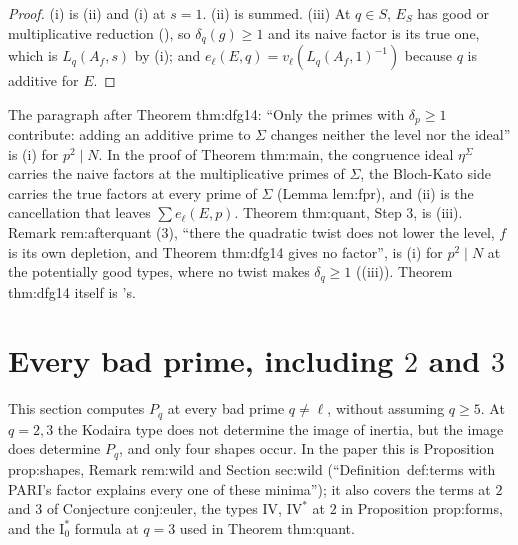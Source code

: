 \begin{proof}
(i) is (ii) and (i) at $s=1$. (ii) is  summed. (iii) At $q\in S$, $E_S$ has good or multiplicative
reduction (), so $\delta_q(g)\ge1$ and its naive factor is its true one, which is $L_q(A_f,s)$ by (i); and $e_\ell(E,q)=v_\ell(L_q(A_f,1)^{-1})$
because $q$ is additive for $E$.
\end{proof}

\begin{paperlink}
The paragraph after Theorem thm:dfg14: ``Only the primes with $\delta_p\ge1$ contribute: adding an additive prime to $\Sigma$ changes neither the level nor the ideal'' is (i) for
$p^2\mid N$. In the proof of Theorem thm:main, the congruence ideal $\eta^\Sigma$ carries the naive factors at the multiplicative primes of $\Sigma$, the Bloch-Kato side carries the
true factors at every prime of $\Sigma$ (Lemma lem:fpr), and (ii) is the cancellation that leaves $\sum e_\ell(E,p)$. Theorem thm:quant, Step 3, is (iii). Remark rem:afterquant (3),
``there the quadratic twist does not lower the level, $f$ is its own depletion, and Theorem thm:dfg14 gives no factor'', is (i) for $p^2\mid N$ at the potentially good types,
where no twist makes $\delta_q\ge1$ ((iii)). Theorem thm:dfg14 itself is 's.
\end{paperlink}

\section{Every bad prime, including \texorpdfstring{$2$}{2} and \texorpdfstring{$3$}{3}}\label{sec:lfunctions:all-primes}

This section computes $P_q$ at every bad prime $q\ne\ell$, without assuming $q\ge5$. At $q=2,3$ the Kodaira type does not determine the image of inertia, but the
image does determine $P_q$, and only four shapes occur. In the paper this is Proposition prop:shapes, Remark rem:wild and Section sec:wild (``Definition~def:terms with
PARI's factor explains every one of these minima''); it also covers the terms at $2$ and $3$ of Conjecture conj:euler, the types $\mathrm{IV}$, $\mathrm{IV}^*$ at $2$ in Proposition
prop:forms, and the $\mathrm I_0^*$ formula at $q=3$ used in Theorem thm:quant.


